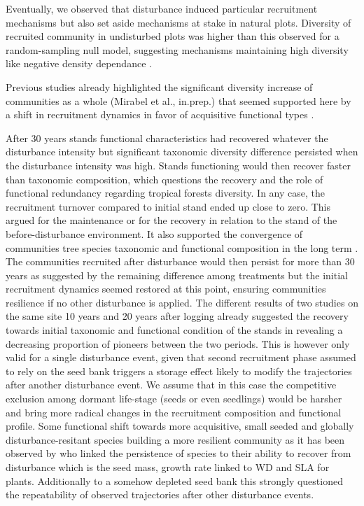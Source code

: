\documentclass[fleqn,10pt]{ArtEcoFoG} %
\begin{document}
Eventually, we observed that disturbance induced particular recruitment
mechanisms but also set aside mechanisms at stake in natural plots.
Diversity of recruited community in undisturbed plots was higher than
this observed for a random-sampling null model, suggesting mechanisms
maintaining high diversity like negative density dependance
\citep{Harms2000}.

Previous studies already highlighted the significant diversity increase
of communities as a whole (Mirabel et al., in.prep.) that seemed
supported here by a shift in recruitment dynamics in favor of
acquisitive functional types \citep{TerSteege2001}.

After 30 years stands functional characteristics had recovered whatever
the disturbance intensity but significant taxonomic diversity difference
persisted when the disturbance intensity was high. Stands functioning
would then recover faster than taxonomic composition, which questions
the recovery and the role of functional redundancy regarding tropical
forests diversity. In any case, the recruitment turnover compared to
initial stand ended up close to zero. This argued for the maintenance or
for the recovery in relation to the stand \citep{Anderson2007} of the
before-disturbance environment. It also supported the convergence of
communities tree species taxonomic and functional composition in the
long term \citep{Li2016}. The communities recruited after disturbance
would then persist for more than 30 years as suggested by the remaining
difference among treatments but the initial recruitment dynamics seemed
restored at this point, ensuring communities resilience if no other
disturbance is applied. The different results of two studies on the same
site 10 years \citep{Molino2001} and 20 years \citep{Baraloto2012a}
after logging already suggested the recovery towards initial taxonomic
and functional condition of the stands in revealing a decreasing
proportion of pioneers between the two periods. This is however only
valid for a single disturbance event, given that second recruitment
phase assumed to rely on the seed bank triggers a storage effect likely
to modify the trajectories after another disturbance event. We assume
that in this case the competitive exclusion among dormant life-stage
(seeds or even seedlings) would be harsher and bring more radical
changes in the recruitment composition and functional profile. Some
functional shift towards more acquisitive, small seeded and globally
disturbance-resitant species building a more resilient community as it
has been observed by \citet{Haddad2008} who linked the persistence of
species to their ability to recover from disturbance which is the seed
mass, growth rate linked to WD and SLA for plants. Additionally to a
somehow depleted seed bank this strongly questioned the repeatability of
observed trajectories after other disturbance events.
\end{document}
